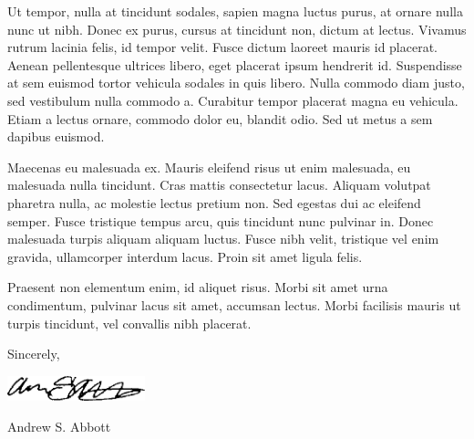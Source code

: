 \documentclass[10pt]{letter}
\begin{document}
Ut tempor, nulla at tincidunt sodales, sapien magna luctus purus, at ornare nulla nunc ut nibh. Donec ex purus, cursus at tincidunt non, dictum at lectus. Vivamus rutrum lacinia felis, id tempor velit. Fusce dictum laoreet mauris id placerat. Aenean pellentesque ultrices libero, eget placerat ipsum hendrerit id. Suspendisse at sem euismod tortor vehicula sodales in quis libero. Nulla commodo diam justo, sed vestibulum nulla commodo a. Curabitur tempor placerat magna eu vehicula. Etiam a lectus ornare, commodo dolor eu, blandit odio. Sed ut metus a sem dapibus euismod.

Maecenas eu malesuada ex. Mauris eleifend risus ut enim malesuada, eu malesuada nulla tincidunt. Cras mattis consectetur lacus. Aliquam volutpat pharetra nulla, ac molestie lectus pretium non. Sed egestas dui ac eleifend semper. Fusce tristique tempus arcu, quis tincidunt nunc pulvinar in. Donec malesuada turpis aliquam aliquam luctus. Fusce nibh velit, tristique vel enim gravida, ullamcorper interdum lacus. Proin sit amet ligula felis. 


Praesent non elementum enim, id aliquet risus. Morbi sit amet urna condimentum, pulvinar lacus sit amet, accumsan lectus. Morbi facilisis mauris ut turpis tincidunt, vel convallis nibh placerat.
\vspace{0.5cm}

Sincerely,\par
\includegraphics[width=4cm]{signature.png}\par
Andrew S. Abbott
\end{document}
